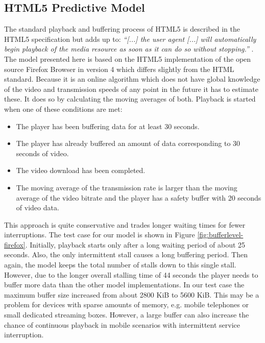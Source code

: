 \subsection{HTML5 Predictive Model}
The standard playback and buffering process of HTML5 is described in the HTML5 specification but adds up to:
\textit{``[...] the user agent [...] will automatically begin playback of the media resource as soon as it can do so without stopping.''} \cite{html5video}. The model presented here is based on the HTML5 implementation of the open source Firefox Browser in version 4 which differs slightly from the HTML standard. Because it is an online algorithm which does not have global knowledge of the video and transmission speeds of any point in the future it has to estimate these. It does so by calculating the moving averages of both. Playback is started when one of these conditions are met:

\begin{itemize}
\item The player has been buffering data for at least 30 seconds.
\item The player has already buffered an amount of data corresponding to 30 seconds of video.
\item The video download has been completed.
\item The moving average of the transmission rate is larger than the moving average of the video bitrate and the player has a safety buffer with 20 seconds of video data.
\end{itemize}

This approach is quite conservative and trades longer waiting times for fewer interruptions. The test case for our model is shown in Figure \ref{fig:bufferlevel-firefox}. Initially, playback starts only after a long waiting period of about 25 seconds. Also, the only intermittent stall causes a long buffering period. Then again, the model keeps the total number of stalls down to this single stall. However, due to the longer overall stalling time of 44 seconds the player needs to buffer more data than the other model implementations. In our test case the maximum buffer size increased from about 2800 KiB to 5600 KiB. This may be a problem for devices with sparse amounts of memory, e.g. mobile telephones or small dedicated streaming boxes. However, a large buffer can also increase the chance of continuous playback in mobile scenarios with intermittent service interruption.



